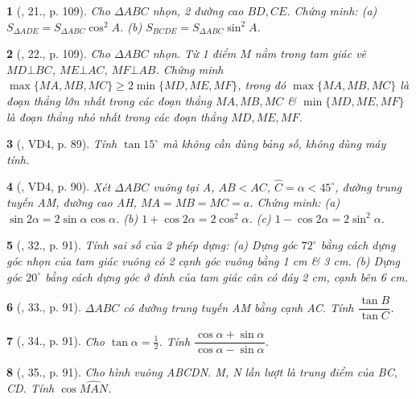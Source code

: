 \documentclass{article}
\newtheorem{baitoan}{}
\begin{document}
\begin{baitoan}[\cite{Tuyen_Toan_9_old}, 21., p. 109]
	Cho $\Delta ABC$ nhọn, 2 đường cao $BD,CE$. Chứng minh: (a) $S_{\Delta ADE} = S_{\Delta ABC}\cos^2A$. (b) $S_{BCDE} = S_{\Delta ABC}\sin^2A$.
\end{baitoan}

\begin{baitoan}[\cite{Tuyen_Toan_9_old}, 22., p. 109]
	Cho $\Delta ABC$ nhọn. Từ 1 điểm $M$ nằm trong tam giác vẽ $MD\bot BC$, $ME\bot AC$, $MF\bot AB$. Chứng minh $\max\{MA,MB,MC\}\ge2\min\{MD,ME,MF\}$, trong đó $\max\{MA,MB,MC\}$ là đoạn thẳng lớn nhất trong các đoạn thẳng $MA,MB,MC$ \& $\min\{MD,ME,MF\}$ là đoạn thẳng nhỏ nhất trong các đoạn thẳng $MD,ME,MF$.
\end{baitoan}

\begin{baitoan}[\cite{Binh_Toan_9_tap_1}, VD4, p. 89]
	Tính $\tan15^\circ$ mà không cần dùng bảng số, không dùng máy tính.
\end{baitoan}

\begin{baitoan}[\cite{Binh_Toan_9_tap_1}, VD4, p. 90]
	Xét $\Delta ABC$ vuông tại A, $AB < AC$, $\widehat{C} = \alpha  < 45^\circ$, đường trung tuyến AM, đường cao AH, $MA = MB = MC = a$. Chứng minh: (a) $\sin2\alpha = 2\sin\alpha\cos\alpha$. (b) $1 + \cos2\alpha = 2\cos^2\alpha$. (c) $1 - \cos2\alpha = 2\sin^2\alpha$.
\end{baitoan}

\begin{baitoan}[\cite{Binh_Toan_9_tap_1}, 32., p. 91]
	Tính sai số của 2 phép dựng: (a) Dựng góc $72^\circ$ bằng cách dựng góc nhọn của tam giác vuông có 2 cạnh góc vuông bằng {\rm1 cm} \& {\rm3 cm}. (b) Dựng góc $20^\circ$ bằng cách dựng góc ở đỉnh của tam giác cân có đáy {\rm2 cm}, cạnh bên {\rm6 cm}.
\end{baitoan}

\begin{baitoan}[\cite{Binh_Toan_9_tap_1}, 33., p. 91]
	$\Delta ABC$ có đường trung tuyến AM bằng cạnh AC. Tính $\dfrac{\tan B}{\tan C}$.
\end{baitoan}

\begin{baitoan}[\cite{Binh_Toan_9_tap_1}, 34., p. 91]
	Cho $\tan\alpha = \frac{1}{2}$. Tính $\dfrac{\cos\alpha + \sin\alpha}{\cos\alpha - \sin\alpha}$.
\end{baitoan}

\begin{baitoan}[\cite{Binh_Toan_9_tap_1}, 35., p. 91]
	Cho hình vuông ABCDN. M, N lần lượt là trung điểm của BC, CD. Tính $\cos\widehat{MAN}$.
\end{baitoan}
\end{document}
